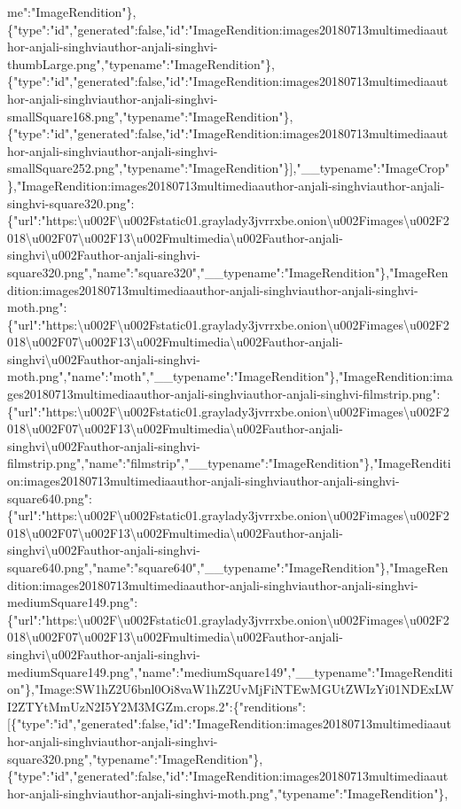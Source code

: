 me":"ImageRendition"\},\{"type":"id","generated":false,"id":"ImageRendition:images20180713multimediaauthor-anjali-singhviauthor-anjali-singhvi-thumbLarge.png","typename":"ImageRendition"\},\{"type":"id","generated":false,"id":"ImageRendition:images20180713multimediaauthor-anjali-singhviauthor-anjali-singhvi-smallSquare168.png","typename":"ImageRendition"\},\{"type":"id","generated":false,"id":"ImageRendition:images20180713multimediaauthor-anjali-singhviauthor-anjali-singhvi-smallSquare252.png","typename":"ImageRendition"\}{]},"\_\_typename":"ImageCrop"\},"ImageRendition:images20180713multimediaauthor-anjali-singhviauthor-anjali-singhvi-square320.png":\{"url":"https:\textbackslash{}u002F\textbackslash{}u002Fstatic01.graylady3jvrrxbe.onion\textbackslash{}u002Fimages\textbackslash{}u002F2018\textbackslash{}u002F07\textbackslash{}u002F13\textbackslash{}u002Fmultimedia\textbackslash{}u002Fauthor-anjali-singhvi\textbackslash{}u002Fauthor-anjali-singhvi-square320.png","name":"square320","\_\_typename":"ImageRendition"\},"ImageRendition:images20180713multimediaauthor-anjali-singhviauthor-anjali-singhvi-moth.png":\{"url":"https:\textbackslash{}u002F\textbackslash{}u002Fstatic01.graylady3jvrrxbe.onion\textbackslash{}u002Fimages\textbackslash{}u002F2018\textbackslash{}u002F07\textbackslash{}u002F13\textbackslash{}u002Fmultimedia\textbackslash{}u002Fauthor-anjali-singhvi\textbackslash{}u002Fauthor-anjali-singhvi-moth.png","name":"moth","\_\_typename":"ImageRendition"\},"ImageRendition:images20180713multimediaauthor-anjali-singhviauthor-anjali-singhvi-filmstrip.png":\{"url":"https:\textbackslash{}u002F\textbackslash{}u002Fstatic01.graylady3jvrrxbe.onion\textbackslash{}u002Fimages\textbackslash{}u002F2018\textbackslash{}u002F07\textbackslash{}u002F13\textbackslash{}u002Fmultimedia\textbackslash{}u002Fauthor-anjali-singhvi\textbackslash{}u002Fauthor-anjali-singhvi-filmstrip.png","name":"filmstrip","\_\_typename":"ImageRendition"\},"ImageRendition:images20180713multimediaauthor-anjali-singhviauthor-anjali-singhvi-square640.png":\{"url":"https:\textbackslash{}u002F\textbackslash{}u002Fstatic01.graylady3jvrrxbe.onion\textbackslash{}u002Fimages\textbackslash{}u002F2018\textbackslash{}u002F07\textbackslash{}u002F13\textbackslash{}u002Fmultimedia\textbackslash{}u002Fauthor-anjali-singhvi\textbackslash{}u002Fauthor-anjali-singhvi-square640.png","name":"square640","\_\_typename":"ImageRendition"\},"ImageRendition:images20180713multimediaauthor-anjali-singhviauthor-anjali-singhvi-mediumSquare149.png":\{"url":"https:\textbackslash{}u002F\textbackslash{}u002Fstatic01.graylady3jvrrxbe.onion\textbackslash{}u002Fimages\textbackslash{}u002F2018\textbackslash{}u002F07\textbackslash{}u002F13\textbackslash{}u002Fmultimedia\textbackslash{}u002Fauthor-anjali-singhvi\textbackslash{}u002Fauthor-anjali-singhvi-mediumSquare149.png","name":"mediumSquare149","\_\_typename":"ImageRendition"\},"Image:SW1hZ2U6bnl0Oi8vaW1hZ2UvMjFiNTEwMGUtZWIzYi01NDExLWI2ZTYtMmUzN2I5Y2M3MGZm.crops.2":\{"renditions":{[}\{"type":"id","generated":false,"id":"ImageRendition:images20180713multimediaauthor-anjali-singhviauthor-anjali-singhvi-square320.png","typename":"ImageRendition"\},\{"type":"id","generated":false,"id":"ImageRendition:images20180713multimediaauthor-anjali-singhviauthor-anjali-singhvi-moth.png","typename":"ImageRendition"\},